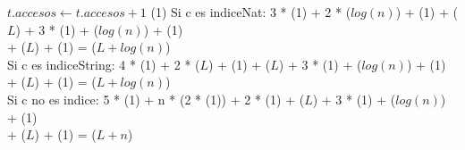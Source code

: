 {        \State
        \State $t.accesos \gets t.accesos + 1$                      \comment \bigo(1)
    \EndIf
}{Si c es indiceNat: 3 * \bigo(1) + 2 * \bigo($log(n)$) + \bigo(1) + \bigo($L$) + 3 * \bigo(1) + \bigo($log(n)$) + \bigo(1) \\
    \hspace*{16em} + \bigo($L$) + \bigo(1) = \bigo($L + log(n)$) \\
    \hspace*{8.25em} Si c es indiceString: 4 * \bigo(1) + 2 * \bigo($L$) + \bigo(1) + \bigo($L$) + 3 * \bigo(1) + \bigo($log(n)$) + \bigo(1) \\
    \hspace*{16em} + \bigo($L$) + \bigo(1) = \bigo($L + log(n)$) \\
    \hspace*{8.25em} Si c no es indice: 5 * \bigo(1) + n * (2 * \bigo(1)) + 2 * \bigo(1) + \bigo($L$) + 3 * \bigo(1) + \bigo($log(n)$) + \bigo(1) \\
    \hspace*{16em} + \bigo($L$) + \bigo(1) = \bigo($L + n$)
}


